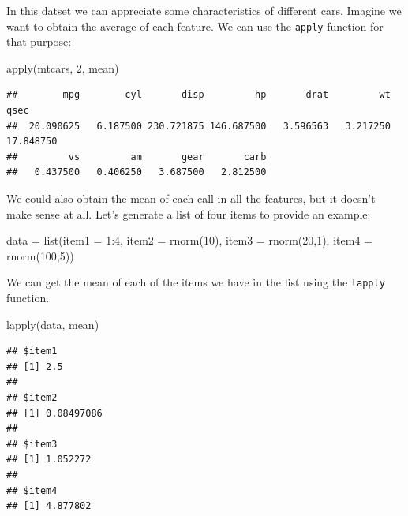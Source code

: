 \documentclass[
]{book}
\newenvironment{Shaded}{\begin{snugshade}}{\end{snugshade}}
\newcommand{\AttributeTok}[1]{\textcolor[rgb]{0.77,0.63,0.00}{#1}}
\newcommand{\DecValTok}[1]{\textcolor[rgb]{0.00,0.00,0.81}{#1}}
\newcommand{\FunctionTok}[1]{\textcolor[rgb]{0.00,0.00,0.00}{#1}}
\newcommand{\NormalTok}[1]{#1}
\newcommand{\OtherTok}[1]{\textcolor[rgb]{0.56,0.35,0.01}{#1}}
\newcommand{\SpecialCharTok}[1]{\textcolor[rgb]{0.00,0.00,0.00}{#1}}
\begin{document}
In this datset we can appreciate some characteristics of different cars. Imagine we want to obtain the average of each feature. We can use the \texttt{apply} function for that purpose:

\begin{Shaded}
\begin{Highlighting}[]
\FunctionTok{apply}\NormalTok{(mtcars, }\DecValTok{2}\NormalTok{, mean)}
\end{Highlighting}
\end{Shaded}

\begin{verbatim}
##        mpg        cyl       disp         hp       drat         wt       qsec 
##  20.090625   6.187500 230.721875 146.687500   3.596563   3.217250  17.848750 
##         vs         am       gear       carb 
##   0.437500   0.406250   3.687500   2.812500
\end{verbatim}

We could also obtain the mean of each call in all the features, but it doesn't make sense at all. Let's generate a list of four items to provide an example:

\begin{Shaded}
\begin{Highlighting}[]
\NormalTok{data }\OtherTok{=} \FunctionTok{list}\NormalTok{(}\AttributeTok{item1 =} \DecValTok{1}\SpecialCharTok{:}\DecValTok{4}\NormalTok{,}
            \AttributeTok{item2 =} \FunctionTok{rnorm}\NormalTok{(}\DecValTok{10}\NormalTok{),}
            \AttributeTok{item3 =} \FunctionTok{rnorm}\NormalTok{(}\DecValTok{20}\NormalTok{,}\DecValTok{1}\NormalTok{),}
            \AttributeTok{item4 =} \FunctionTok{rnorm}\NormalTok{(}\DecValTok{100}\NormalTok{,}\DecValTok{5}\NormalTok{))}
\end{Highlighting}
\end{Shaded}

We can get the mean of each of the items we have in the list using the \texttt{lapply} function.

\begin{Shaded}
\begin{Highlighting}[]
\FunctionTok{lapply}\NormalTok{(data, mean)}
\end{Highlighting}
\end{Shaded}

\begin{verbatim}
## $item1
## [1] 2.5
## 
## $item2
## [1] 0.08497086
## 
## $item3
## [1] 1.052272
## 
## $item4
## [1] 4.877802
\end{verbatim}
\end{document}
